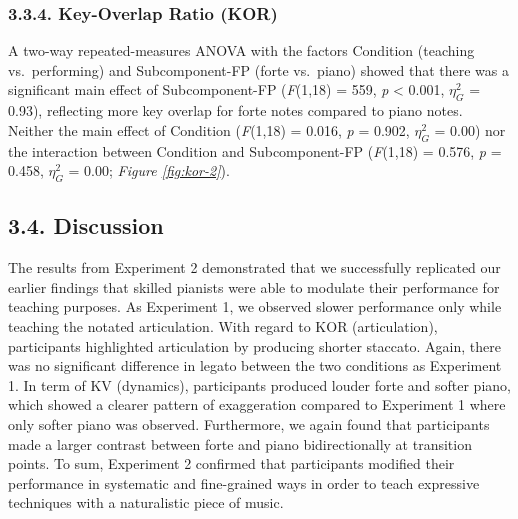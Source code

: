 \documentclass[
  english,
  man,floatsintext]{apa6}
\begin{document}
\hypertarget{key-overlap-ratio-kor-1}{%
\subsubsection{3.3.4. Key-Overlap Ratio (KOR)}\label{key-overlap-ratio-kor-1}}

A two-way repeated-measures ANOVA with the factors Condition (teaching vs.~performing) and Subcomponent-FP (forte vs.~piano) showed that there was a significant main effect of Subcomponent-FP (\emph{F}(1,18) = 559, \emph{p} \textless{} 0.001, \(\eta_G^2\) = 0.93), reflecting more key overlap for forte notes compared to piano notes. Neither the main effect of Condition (\emph{F}(1,18) = 0.016, \emph{p} = 0.902, \(\eta_G^2\) = 0.00) nor the interaction between Condition and Subcomponent-FP (\emph{F}(1,18) = 0.576, \emph{p} = 0.458, \(\eta_G^2\) = 0.00; \emph{Figure \ref{fig:kor-2}}).

\hypertarget{discussion-1}{%
\subsection{3.4. Discussion}\label{discussion-1}}

The results from Experiment 2 demonstrated that we successfully replicated our earlier findings that skilled pianists were able to modulate their performance for teaching purposes. As Experiment 1, we observed slower performance only while teaching the notated articulation. With regard to KOR (articulation), participants highlighted articulation by producing shorter staccato. Again, there was no significant difference in legato between the two conditions as Experiment 1. In term of KV (dynamics), participants produced louder forte and softer piano, which showed a clearer pattern of exaggeration compared to Experiment 1 where only softer piano was observed. Furthermore, we again found that participants made a larger contrast between forte and piano bidirectionally at transition points. To sum, Experiment 2 confirmed that participants modified their performance in systematic and fine-grained ways in order to teach expressive techniques with a naturalistic piece of music.
\end{document}
